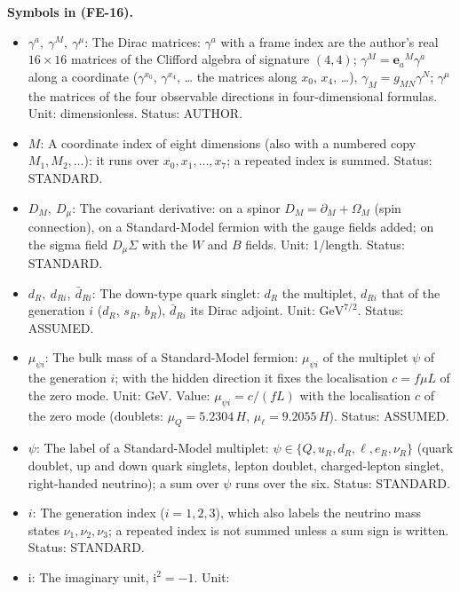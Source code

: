 \documentclass[
  10pt,
]{article}
\providecommand{\tightlist}{%
  \setlength{\itemsep}{0pt}\setlength{\parskip}{0pt}}
\begin{document}
\textbf{Symbols in (FE-16).}

\begin{itemize}
\tightlist
\item
  \(\gamma^a,\ \gamma^M,\ \gamma^\mu\): The Dirac matrices: \(\gamma^a\)
  with a frame index are the author's real \(16 \times 16\) matrices of
  the Clifford algebra of signature \((4, 4)\);
  \(\gamma^M = \mathbf{e}_a{}^M\gamma^a\) along a coordinate
  (\(\gamma^{x_0}\), \(\gamma^{x_4}\), \ldots{} the matrices along
  \(x_0\), \(x_4\), \ldots), \(\gamma_M = g_{MN}\gamma^N\);
  \(\gamma^\mu\) the matrices of the four observable directions in
  four-dimensional formulas. Unit: dimensionless. Status: AUTHOR.
\item
  \(M\): A coordinate index of eight dimensions (also with a numbered
  copy \(M_1, M_2, \dots\)): it runs over \(x_0, x_1, \dots, x_7\); a
  repeated index is summed. Status: STANDARD.
\item
  \(D_M,\ D_\mu\): The covariant derivative: on a spinor
  \(D_M = \partial_M + \Omega_M\) (spin connection), on a Standard-Model
  fermion with the gauge fields added; on the sigma field
  \(D_\mu\Sigma\) with the \(W\) and \(B\) fields. Unit: 1/length.
  Status: STANDARD.
\item
  \(d_R,\ d_{Ri},\ \bar d_{Ri}\): The down-type quark singlet: \(d_R\)
  the multiplet, \(d_{Ri}\) that of the generation \(i\) (\(d_R\),
  \(s_R\), \(b_R\)), \(\bar d_{Ri}\) its Dirac adjoint. Unit:
  \(\mathrm{GeV}^{7/2}\). Status: ASSUMED.
\item
  \(\mu_{\psi i}\): The bulk mass of a Standard-Model fermion:
  \(\mu_{\psi i}\) of the multiplet \(\psi\) of the generation \(i\);
  with the hidden direction it fixes the localisation \(c = f\mu L\) of
  the zero mode. Unit: GeV. Value: \(\mu_{\psi i} = c/(fL)\) with the
  localisation \(c\) of the zero mode (doublets: \(\mu_Q = 5.2304\,H\),
  \(\mu_\ell = 9.2055\,H\)). Status: ASSUMED.
\item
  \(\psi\): The label of a Standard-Model multiplet:
  \(\psi \in \{Q, u_R, d_R, \ell, e_R, \nu_R\}\) (quark doublet, up and
  down quark singlets, lepton doublet, charged-lepton singlet,
  right-handed neutrino); a sum over \(\psi\) runs over the six. Status:
  STANDARD.
\item
  \(i\): The generation index (\(i = 1, 2, 3\)), which also labels the
  neutrino mass states \(\nu_1, \nu_2, \nu_3\); a repeated index is not
  summed unless a sum sign is written. Status: STANDARD.
\item
  \(\mathrm{i}\): The imaginary unit, \(\mathrm{i}^2 = -1\). Unit:

\end{itemize}
\end{document}
